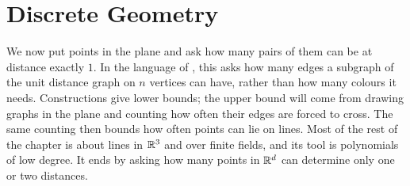 \chapter{Discrete Geometry} \label{Ch7:CH}
\thispagestyle{empty}

We now put points in the plane and ask how many pairs of them can be at distance exactly $1$. In the language of , this asks how many edges a subgraph of the unit distance graph on $n$ vertices can have, rather than how many colours it needs. Constructions give lower bounds; the upper bound will come from drawing graphs in the plane and counting how often their edges are forced to cross. The same counting then bounds how often points can lie on lines. Most of the rest of the chapter is about lines in $\mathbb{R}^3$ and over finite fields, and its tool is polynomials of low degree. It ends by asking how many points in $\mathbb{R}^d$ can determine only one or two distances.







